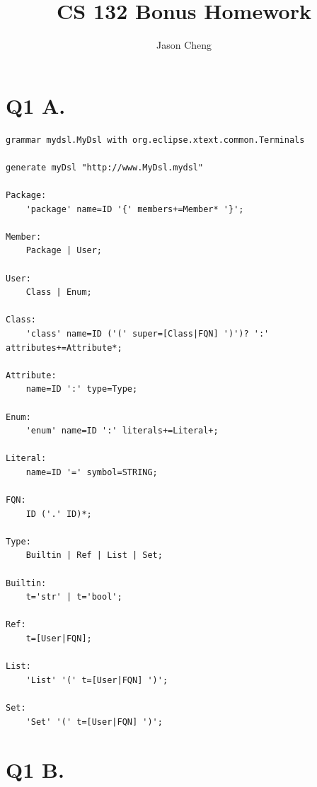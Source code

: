 \documentclass{article}
\title{CS 132 Bonus Homework}
\author{Jason Cheng}
\date{}
\begin{document}
\maketitle

\section*{Q1 A.}

\begin{verbatim}
grammar mydsl.MyDsl with org.eclipse.xtext.common.Terminals

generate myDsl "http://www.MyDsl.mydsl"

Package:
	'package' name=ID '{' members+=Member* '}';

Member:
	Package | User;

User:
	Class | Enum;

Class:
	'class' name=ID ('(' super=[Class|FQN] ')')? ':' attributes+=Attribute*;

Attribute:
	name=ID ':' type=Type;

Enum:
	'enum' name=ID ':' literals+=Literal+;

Literal:
	name=ID '=' symbol=STRING;

FQN:
	ID ('.' ID)*;

Type:
	Builtin | Ref | List | Set;

Builtin:
	t='str' | t='bool';

Ref:
	t=[User|FQN];

List:
	'List' '(' t=[User|FQN] ')';

Set:
	'Set' '(' t=[User|FQN] ')';
\end{verbatim}

\section*{Q1 B.}
\end{document}
